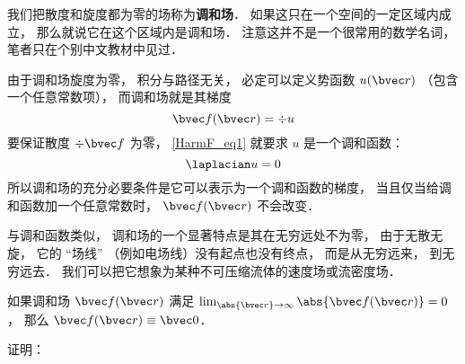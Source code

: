 
\begin{issues}
\issueDraft
\end{issues}


我们把散度和旋度都为零的场称为\textbf{调和场}． 如果这只在一个空间的一定区域内成立， 那么就说它在这个区域内是调和场． 注意这并不是一个很常用的数学名词， 笔者只在个别中文教材中见过．

由于调和场旋度为零， 积分与路径无关， 必定可以定义势函数 $u(\bvec r)$ （包含一个任意常数项）， 而调和场就是其梯度
\begin{equation}\label{HarmF_eq1}
\bvec f(\bvec r) = \div u
\end{equation}
要保证散度 $\div \bvec f$ 为零， \autoref{HarmF_eq1} 就要求 $u$ 是一个调和函数：
\begin{equation}
\laplacian u = 0
\end{equation}
所以调和场的充分必要条件是它可以表示为一个调和函数的梯度， 当且仅当给调和函数加一个任意常数时， $\bvec f(\bvec r)$ 不会改变．

与调和函数类似， 调和场的一个显著特点是其在无穷远处不为零， 由于无散无旋， 它的 “场线” （例如电场线）没有起点也没有终点， 而是从无穷远来， 到无穷远去． 我们可以把它想象为某种不可压缩流体的速度场或流密度场．

\begin{theorem}{}
如果调和场 $\bvec f(\bvec r)$ 满足 $\lim_{\abs{\bvec r}\to \infty} \abs{\bvec f(\bvec r)}  = 0$， 那么 $\bvec f(\bvec r) \equiv \bvec 0$．
\end{theorem}
证明： 
